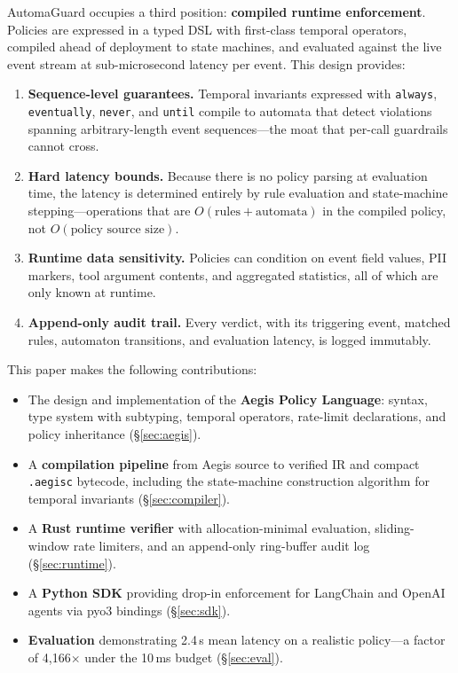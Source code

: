\documentclass[sigconf]{acmart}
\begin{document}
AutomaGuard occupies a third position: \textbf{compiled runtime enforcement}.
Policies are expressed in a typed DSL with first-class temporal operators,
compiled ahead of deployment to state machines, and evaluated against the live
event stream at sub-microsecond latency per event. This design provides:

\begin{enumerate}
  \item \textbf{Sequence-level guarantees.} Temporal invariants expressed with
    \texttt{always}, \texttt{eventually}, \texttt{never}, and \texttt{until}
    compile to automata that detect violations spanning arbitrary-length event
    sequences---the moat that per-call guardrails cannot cross.
  \item \textbf{Hard latency bounds.} Because there is no policy parsing at
    evaluation time, the latency is determined entirely by rule evaluation and
    state-machine stepping---operations that are $O(\text{rules} + \text{automata})$
    in the compiled policy, not $O(\text{policy source size})$.
  \item \textbf{Runtime data sensitivity.} Policies can condition on event field
    values, PII markers, tool argument contents, and aggregated statistics, all
    of which are only known at runtime.
  \item \textbf{Append-only audit trail.} Every verdict, with its triggering
    event, matched rules, automaton transitions, and evaluation latency, is
    logged immutably.
\end{enumerate}

This paper makes the following contributions:
\begin{itemize}
  \item The design and implementation of the \textbf{Aegis Policy Language}:
    syntax, type system with subtyping, temporal operators, rate-limit
    declarations, and policy inheritance (\S\ref{sec:aegis}).
  \item A \textbf{compilation pipeline} from Aegis source to verified IR and
    compact \texttt{.aegisc} bytecode, including the state-machine construction
    algorithm for temporal invariants (\S\ref{sec:compiler}).
  \item A \textbf{Rust runtime verifier} with allocation-minimal evaluation,
    sliding-window rate limiters, and an append-only ring-buffer audit log
    (\S\ref{sec:runtime}).
  \item A \textbf{Python SDK} providing drop-in enforcement for LangChain and
    OpenAI agents via pyo3 bindings (\S\ref{sec:sdk}).
  \item \textbf{Evaluation} demonstrating 2.4\,\textmu s mean latency on a
    realistic policy---a factor of 4{,}166$\times$ under the 10\,ms budget
    (\S\ref{sec:eval}).
\end{itemize}
\end{document}
